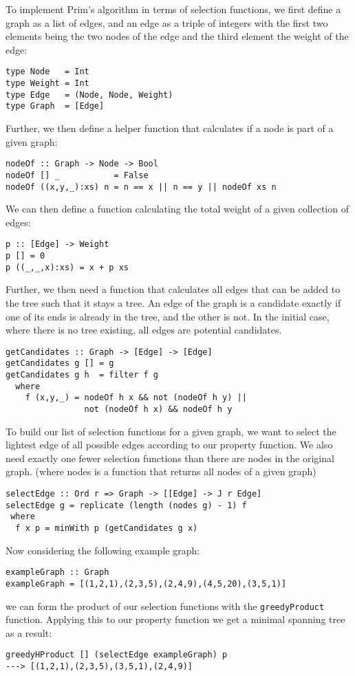 \documentclass[runningheads]{llncs}
\begin{document}
To implement Prim's algorithm in terms of selection functions, we first define a graph as a list of edges, and an edge as a triple of integers with the first two elements being the two nodes of the edge and the third element the weight of the edge:
\begin{verbatim}
type Node   = Int
type Weight = Int
type Edge   = (Node, Node, Weight)
type Graph  = [Edge]
\end{verbatim}
Further, we then define a helper function that calculates if a node is part of a given graph:
\begin{verbatim}
nodeOf :: Graph -> Node -> Bool
nodeOf [] _           = False
nodeOf ((x,y,_):xs) n = n == x || n == y || nodeOf xs n
\end{verbatim}
We can then define a function calculating the total weight of a given collection of edges:
\begin{verbatim}
p :: [Edge] -> Weight
p [] = 0
p ((_,_,x):xs) = x + p xs
\end{verbatim}
Further, we then need a function that calculates all edges that can be added to the tree such that it stays a tree. An edge of the graph is a candidate exactly if one of its ends is already in the tree, and the other is not. In the initial case, where there is no tree existing, all edges are potential candidates.
\begin{verbatim}
getCandidates :: Graph -> [Edge] -> [Edge]
getCandidates g [] = g
getCandidates g h  = filter f g
  where
    f (x,y,_) = nodeOf h x && not (nodeOf h y) || 
                not (nodeOf h x) && nodeOf h y
\end{verbatim}
To build our list of selection functions for a given graph, we want to select the lightest edge of all possible edges according to our property function. We also need exactly one fewer selection functions than there are nodes in the original graph. (where nodes is a function that returns all nodes of a given graph)
\begin{verbatim}
selectEdge :: Ord r => Graph -> [[Edge] -> J r Edge]
selectEdge g = replicate (length (nodes g) - 1) f
 where
  f x p = minWith p (getCandidates g x)
\end{verbatim}
Now considering the following example graph:
\begin{verbatim}
exampleGraph :: Graph
exampleGraph = [(1,2,1),(2,3,5),(2,4,9),(4,5,20),(3,5,1)]
\end{verbatim}
we can form the product of our selection functions with the \texttt{greedyProduct} function. Applying this to our property function we get a minimal spanning tree as a result:
\begin{verbatim}
greedyHProduct [] (selectEdge exampleGraph) p
---> [(1,2,1),(2,3,5),(3,5,1),(2,4,9)]
\end{verbatim}
%
%
%
\end{document}
